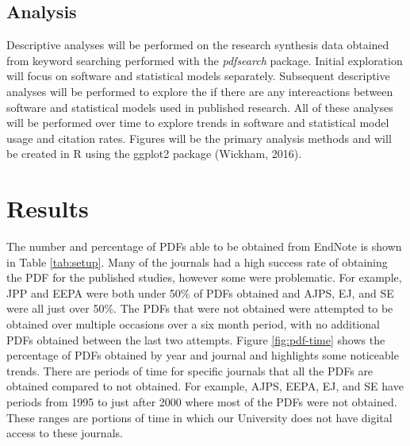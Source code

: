 \documentclass[english,,man]{apa6}
\theoremstyle{definition}
\theoremstyle{definition}
\theoremstyle{definition}
\theoremstyle{remark}
\begin{document}
\hypertarget{analysis}{%
\subsection{Analysis}\label{analysis}}

Descriptive analyses will be performed on the research synthesis data
obtained from keyword searching performed with the \emph{pdfsearch}
package. Initial exploration will focus on software and statistical
models separately. Subsequent descriptive analyses will be performed to
explore the if there are any intereactions between software and
statistical models used in published research. All of these analyses
will be performed over time to explore trends in software and
statistical model usage and citation rates. Figures will be the primary
analysis methods and will be created in R using the ggplot2 package
(Wickham, 2016).

\hypertarget{results}{%
\section{Results}\label{results}}

The number and percentage of PDFs able to be obtained from EndNote is
shown in Table \ref{tab:setup}. Many of the journals had a high success
rate of obtaining the PDF for the published studies, however some were
problematic. For example, JPP and EEPA were both under 50\% of PDFs
obtained and AJPS, EJ, and SE were all just over 50\%. The PDFs that
were not obtained were attempted to be obtained over multiple occasions
over a six month period, with no additional PDFs obtained between the
last two attempts. Figure \ref{fig:pdf-time} shows the percentage of
PDFs obtained by year and journal and highlights some noticeable trends.
There are periods of time for specific journals that all the PDFs are
obtained compared to not obtained. For example, AJPS, EEPA, EJ, and SE
have periods from 1995 to just after 2000 where most of the PDFs were
not obtained. These ranges are portions of time in which our University
does not have digital access to these journals.
\end{document}
